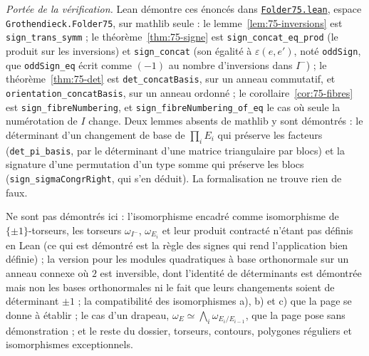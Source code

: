 \begingroup\raggedright
\noindent\emph{Portée de la vérification.} Lean démontre ces énoncés dans \href{\leanblobmain/LinearAlgebra/Folder75.lean}{\texttt{Folder75.\allowbreak{}lean}}, espace \texttt{Grothendieck.\allowbreak{}Folder75}, sur mathlib seule : le lemme~\ref{lem:75-inversions} est \texttt{sign\_trans\_symm} ; le théorème~\ref{thm:75-signe} est \texttt{sign\_concat\_eq\_prod} (le produit sur les inversions) et \texttt{sign\_concat} (son égalité à $\varepsilon(e, e')$, noté \texttt{oddSign}, que \texttt{oddSign\_eq} écrit comme $(-1)$ au nombre d'inversions dans $I^-$) ; le théorème~\ref{thm:75-det} est \texttt{det\_concatBasis}, sur un anneau commutatif, et \texttt{orientation\_concatBasis}, sur un anneau ordonné ; le corollaire~\ref{cor:75-fibres} est \texttt{sign\_fibreNumbering}, et \texttt{sign\_fibreNumbering\_of\_eq} le cas où seule la numérotation de $I$ change. Deux lemmes absents de mathlib y sont démontrés : le déterminant d'un changement de base de $\prod_i E_i$ qui préserve les facteurs (\texttt{det\_pi\_basis}, par le déterminant d'une matrice triangulaire par blocs) et la signature d'une permutation d'un type somme qui préserve les blocs (\texttt{sign\_sigmaCongrRight}, qui s'en déduit). La formalisation ne trouve rien de faux.\par\endgroup

Ne sont pas démontrés ici : l'isomorphisme encadré comme isomorphisme de $\{\pm 1\}$-torseurs, les torseurs $\omega_{I^-}$, $\omega_{E_i}$ et leur produit contracté n'étant pas définis en Lean (ce qui est démontré est la règle des signes qui rend l'application bien définie) ; la version pour les modules quadratiques à base orthonormale sur un anneau connexe où $2$ est inversible, dont l'identité de déterminants est démontrée mais non les bases orthonormales ni le fait que leurs changements soient de déterminant $\pm 1$ ; la compatibilité des isomorphismes a), b) et c) que la page se donne à établir ; le cas d'un drapeau, $\omega_E \simeq \bigwedge_i \omega_{E_i/E_{i-1}}$, que la page pose sans démonstration ; et le reste du dossier, torseurs, contours, polygones réguliers et isomorphismes exceptionnels.
